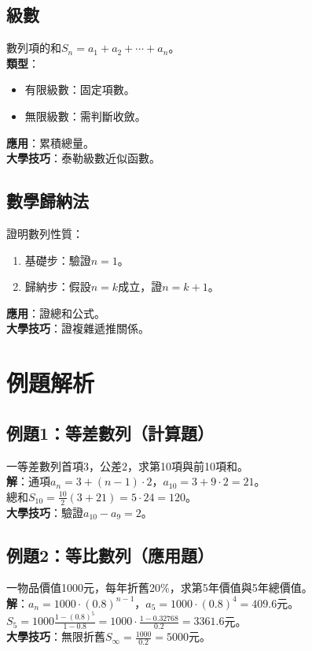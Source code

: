 \subsection{級數}
數列項的和$S_n = a_1 + a_2 + \cdots + a_n$。\\
\textbf{類型}：
\begin{itemize}
    \item 有限級數：固定項數。
    \item 無限級數：需判斷收斂。
\end{itemize}
\textbf{應用}：累積總量。\\
\textbf{大學技巧}：泰勒級數近似函數。

\subsection{數學歸納法}
證明數列性質：
\begin{enumerate}
    \item 基礎步：驗證$n = 1$。
    \item 歸納步：假設$n = k$成立，證$n = k+1$。
\end{enumerate}
\textbf{應用}：證總和公式。\\
\textbf{大學技巧}：證複雜遞推關係。

\section{例題解析}

\subsection{例題1：等差數列（計算題）}
一等差數列首項$3$，公差$2$，求第10項與前10項和。\\
\textbf{解}：通項$a_n = 3 + (n-1) \cdot 2$，$a_{10} = 3 + 9 \cdot 2 = 21$。\\
總和$S_{10} = \frac{10}{2} (3 + 21) = 5 \cdot 24 = 120$。\\
\textbf{大學技巧}：驗證$a_{10} - a_9 = 2$。

\subsection{例題2：等比數列（應用題）}
一物品價值1000元，每年折舊20\%，求第5年價值與5年總價值。\\
\textbf{解}：$a_n = 1000 \cdot (0.8)^{n-1}$，$a_5 = 1000 \cdot (0.8)^4 = 409.6$元。\\
$S_5 = 1000 \frac{1 - (0.8)^5}{1 - 0.8} = 1000 \cdot \frac{1 - 0.32768}{0.2} = 3361.6$元。\\
\textbf{大學技巧}：無限折舊$S_\infty = \frac{1000}{0.2} = 5000$元。

